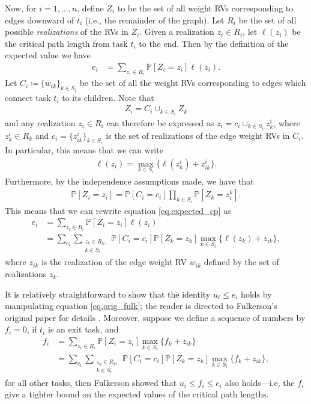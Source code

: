 \documentclass[12pt]{article}
\def\P{\mathbb{P}}
\begin{document}
Now, for $i = 1, \dots, n$, define $Z_i$ to be the set of all weight RVs corresponding to edges downward of $t_i$ (i.e., the remainder of the graph). Let $R_i$ be the set of all possible {\em realizations} of the RVs in $Z_i$. Given a realization $z_i \in R_i$, let $\ell(z_i)$ be the critical path length from task $t_i$ to the end. Then by the definition of the expected value we have
\begin{align}
e_i &= \sum_{z_i \in R_i} \P[Z_i = z_i] \ell(z_i). \label{eq.expected_cp}
\end{align}
Let $C_i \coloneqq \{ w_{ik} \}_{k \in S_i}$ be the set of all the weight RVs corresponding to edges which connect task $t_i$ to its children. Note that 
\begin{align*}
Z_i = C_i \cup_{k \in S_i} Z_k 
\end{align*}
and any realization $z_i \in R_i$ can therefore be expressed as $z_i = c_i \cup_{k \in S_i} z_k^i$, where $z_k^i \in R_k$ and $c_i = \{ z_{ik}^i\}_{k \in S_i}$ is the set of realizations of the edge weight RVs in $C_i$. In particular, this means that we can write
\begin{align*}
\ell(z_i) = \max_{k \in S_i} \{ \ell(z_{k}^i) + z_{ik}^i \}.
\end{align*}
Furthermore, by the independence assumptions made, we have that
\begin{align*}
\P[Z_i = z_i] = \P[C_i = c_i] \prod_{k \in S_i} \P[Z_k = z_i^k]. 
\end{align*} 
This means that we can rewrite equation \eqref{eq.expected_cp} as
\begin{align}
e_i &= \sum_{z_i \in R_i} \P[Z_i = z_i] \ell(z_i) \nonumber \\
&= \sum_{c_i} \sum_{\substack{z_k \in R_k, \\ k \in S_i}} \P[C_i = c_i] \P[Z_{k} = z_{k}] \max_{k \in S_i} \{ \ell(z_{k}) + z_{ik} \}, \label{eq.orig_fulk} 
\end{align}
where $z_{ik}$ is the realization of the edge weight RV $w_{ik}$ defined by the set of realizations $z_k$.

It is relatively straightforward to show that the identity $u_i \leq e_i$ holds by manipulating equation \eqref{eq.orig_fulk}; the reader is directed to Fulkerson's original paper for details \cite{fulk62}. Moreover, suppose we define a sequence of numbers by $f_i = 0$, if $t_i$ is an exit task, and
\begin{align}
f_i &= \sum_{z_i \in R_i} \P[Z_i = z_i] \max_{k \in S_i} \{ f_k + z_{ik} \} \nonumber \\
&= \sum_{c_i} \sum_{\substack{z_k \in R_k, \\ k \in S_i}} \P[C_i = c_i] \P[Z_{k} = z_{k}] \max_{k \in S_i} \{ f_k + z_{ik} \}, \label{eq.f_fulkerson}
\end{align}
for all other tasks, then Fulkerson showed that $u_i \leq f_i \leq e_i$ also holds---i.e, the $f_i$ give a tighter bound on the expected values of the critical path lengths.
\end{document}
